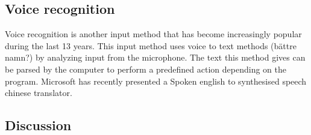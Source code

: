 

\subsection{Voice recognition}

Voice recognition is another input method that has become increasingly popular during the last 13 years. This input method uses voice to text methods (bättre namn?) by analyzing input from the microphone. The text this method gives can be parsed by the computer to perform a predefined action depending on the program. Microsoft has recently presented a Spoken english to synthesised speech chinese translator. 

\subsection{Discussion}

